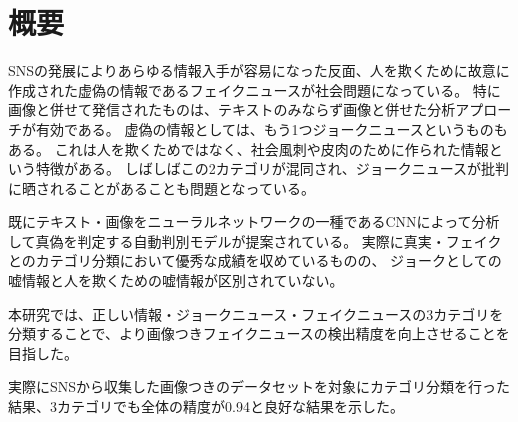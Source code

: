 \chapter{概要}

SNSの発展によりあらゆる情報入手が容易になった反面、人を欺くために故意に作成された虚偽の情報であるフェイクニュースが社会問題になっている。
特に画像と併せて発信されたものは、テキストのみならず画像と併せた分析アプローチが有効である。
虚偽の情報としては、もう1つジョークニュースというものもある。
これは人を欺くためではなく、社会風刺や皮肉のために作られた情報という特徴がある。
しばしばこの2カテゴリが混同され、ジョークニュースが批判に晒されることがあることも問題となっている。

既にテキスト・画像をニューラルネットワークの一種であるCNNによって分析して真偽を判定する自動判別モデルが提案されている。
実際に真実・フェイクとのカテゴリ分類において優秀な成績を収めているものの、
ジョークとしての嘘情報と人を欺くための嘘情報が区別されていない。


本研究では、正しい情報・ジョークニュース・フェイクニュースの3カテゴリを分類することで、より画像つきフェイクニュースの検出精度を向上させることを目指した。


実際にSNSから収集した画像つきのデータセットを対象にカテゴリ分類を行った結果、3カテゴリでも全体の精度が0.94と良好な結果を示した。



%
